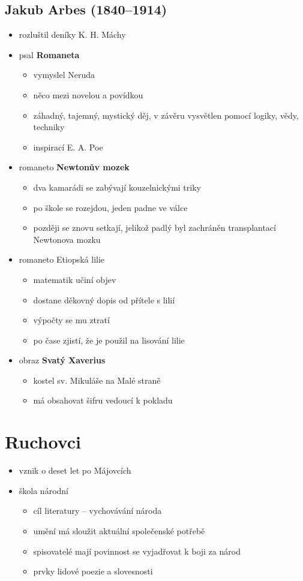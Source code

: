 \subsection{Jakub Arbes (1840--1914)}
\begin{itemize}
\item rozluštil deníky K. H. Máchy
\item psal \textbf{Romaneta}
	\begin{itemize}
	\item vymyslel Neruda
	\item něco mezi novelou a povídkou
	\item záhadný, tajemný, mystický děj, v závěru vysvětlen pomocí logiky, vědy, techniky
	\item inspirací E. A. Poe
	\end{itemize}
\item romaneto \textbf{Newtonův mozek}
	\begin{itemize}
	\item dva kamarádi se zabývají kouzelnickými triky
	\item po škole se rozejdou, jeden padne ve válce
	\item později se znovu setkají, jelikož padlý byl zachráněn transplantací Newtonova mozku
	\end{itemize}
\item romaneto Etiopská lilie
	\begin{itemize}
	\item matematik učiní objev
	\item dostane děkovný dopis od přítele s lilií
	\item výpočty se mu ztratí
	\item po čase zjistí, že je použil na lisování lilie
	\end{itemize}
\item obraz \textbf{Svatý Xaverius}
	\begin{itemize}
	\item kostel sv. Mikuláše na Malé straně
	\item má obsahovat šifru vedoucí k pokladu
	\end{itemize}
\end{itemize}


\section{Ruchovci}
\begin{itemize}
\item vznik o deset let po Májovcích
\item škola národní
	\begin{itemize}
	\item cíl literatury -- vychovávání národa
	\item umění má sloužit aktuální společenské potřebě
	\item spisovatelé mají povinnost se vyjadřovat k boji za národ
	\item prvky lidové poezie a slovesnosti
	\end{itemize}
\end{itemize}

